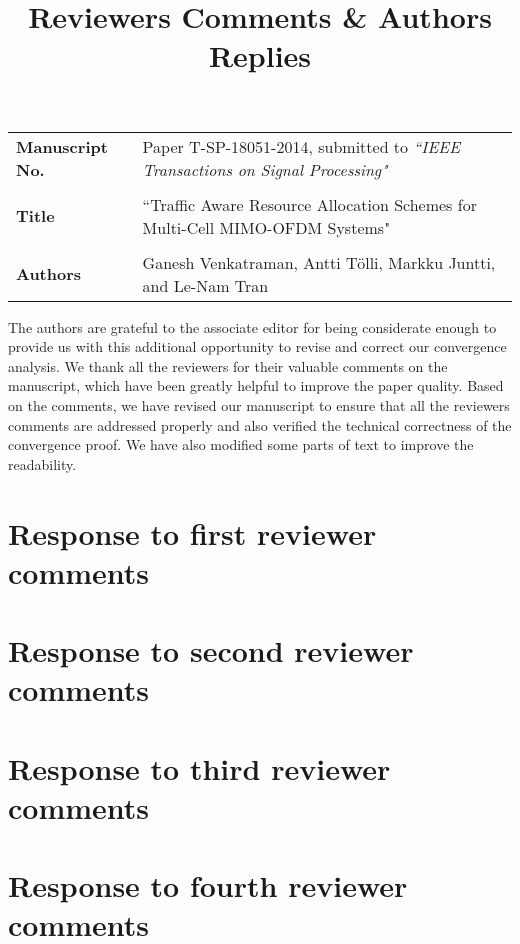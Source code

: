\documentclass[10pt,letterpaper,onecolumn]{article}
\begin{document}
\title{Reviewers Comments \& Authors Replies}

\date{}
\maketitle

\begin{tabular}{p{1.25in}p{4.25in}}
\textbf{Manuscript No.} & Paper T-SP-18051-2014, submitted to \emph{``IEEE Transactions on Signal Processing"} \\ \\
\textbf{Title} & ``Traffic Aware Resource Allocation Schemes for Multi-Cell MIMO-OFDM Systems" \\ \\
\textbf{Authors} & Ganesh Venkatraman, Antti T\"{o}lli, Markku Juntti, and Le-Nam Tran
\end{tabular}

\vspace{0.35in}
The authors are grateful to the associate editor for being considerate enough to provide us with this additional opportunity to revise and correct our convergence analysis. We thank all the reviewers for their valuable comments on the manuscript, which have been greatly helpful to improve the paper quality. Based on the comments, we have revised our manuscript to ensure that all the reviewers comments are addressed properly and also verified the technical correctness of the convergence proof. We have also modified some parts of text to improve the readability.


\newpage
\section*{Response to first reviewer comments}


\newpage
\section*{Response to second reviewer comments}


\newpage
\section*{Response to third reviewer comments}


\newpage
\section*{Response to fourth reviewer comments}

\end{document}
